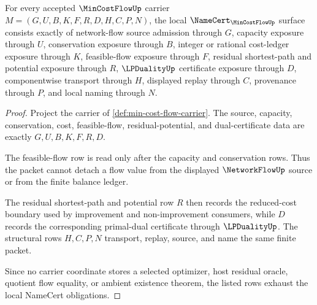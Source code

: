 \begin{theorem}
\label{thm:min-cost-flow-namecert-obligations}
For every accepted $\MinCostFlowUp$ carrier $M=(G,U,B,K,F,R,D,H,C,P,N)$, the local $\NameCert_{\MinCostFlowUp}$ surface consists exactly of network-flow source admission through $G$, capacity exposure through $U$, conservation exposure through $B$, integer or rational cost-ledger exposure through $K$, feasible-flow exposure through $F$, residual shortest-path and potential exposure through $R$, $\LPDualityUp$ certificate exposure through $D$, componentwise transport through $H$, displayed replay through $C$, provenance through $P$, and local naming through $N$.
\end{theorem}
\begin{proof}
Project the carrier of \autoref{def:min-cost-flow-carrier}. The source, capacity, conservation, cost, feasible-flow, residual-potential, and dual-certificate data are exactly $G,U,B,K,F,R,D$.

The feasible-flow row is read only after the capacity and conservation rows. Thus the packet cannot detach a flow value from the displayed $\NetworkFlowUp$ source or from the finite balance ledger.

The residual shortest-path and potential row $R$ then records the reduced-cost boundary used by improvement and non-improvement consumers, while $D$ records the corresponding primal-dual certificate through $\LPDualityUp$. The structural rows $H,C,P,N$ transport, replay, source, and name the same finite packet.

Since no carrier coordinate stores a selected optimizer, host residual oracle, quotient flow equality, or ambient existence theorem, the listed rows exhaust the local NameCert obligations.
\end{proof}

